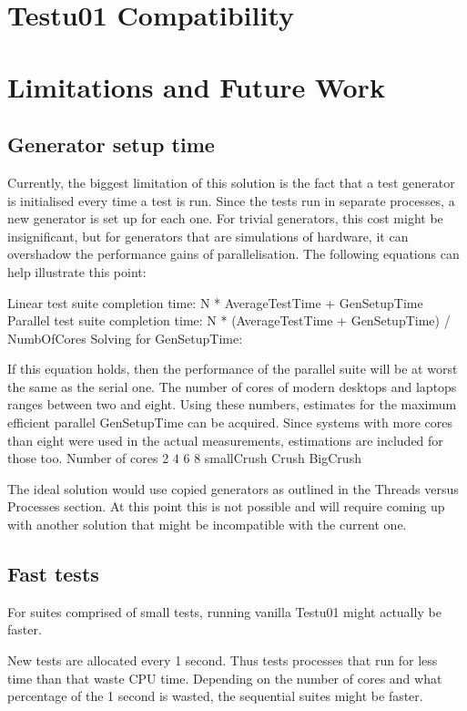 \section{Testu01 Compatibility}

\section{Limitations and Future Work}

\subsection{Generator setup time}
Currently, the biggest limitation of this solution is the fact that a test generator is initialised every time a test is run. Since the tests run in separate processes, a new generator is set up for each one.
For trivial generators, this cost might be insignificant, but for generators that are simulations of hardware, it can overshadow the performance gains of parallelisation. The following equations can help illustrate this point:

Linear test suite completion time: N * AverageTestTime + GenSetupTime
Parallel test suite completion time: N * (AverageTestTime + GenSetupTime) / NumbOfCores
Solving for GenSetupTime:

If this equation holds, then the performance of the parallel suite will be at worst the same as the serial one.
The number of cores of modern desktops and laptops ranges between two and eight. Using these numbers, estimates for the maximum efficient parallel GenSetupTime can be acquired. Since systems with more cores than eight were used in the actual measurements, estimations are included for those too.
Number of cores
2 4 6 8
smallCrush
Crush
BigCrush

The ideal solution would use copied generators as outlined in the Threads versus Processes section. At this point this is not possible and will require coming up with another solution that might be incompatible with the current one.

\subsection{Fast tests}
For suites comprised of small tests, running vanilla Testu01 might actually be faster.

New tests are allocated every 1 second. Thus tests processes that run for less time than that waste CPU time. Depending on the number of cores and what percentage of the 1 second is wasted, the sequential suites might be faster.

